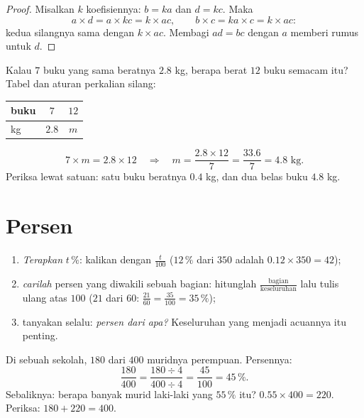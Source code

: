 \begin{proof}
Misalkan $k$ koefisiennya: $b = ka$ dan $d = kc$. Maka
\[
a \times d = a \times kc = k \times ac,
\qquad
b \times c = ka \times c = k \times ac :
\]
kedua  silangnya sama dengan $k \times ac$. Membagi
$ad = bc$ dengan $a$ memberi rumus untuk $d$.
\end{proof}

\begin{example}\label{ex:g7:prop:fourth}
Kalau $7$ buku yang sama beratnya $2.8$ kg, berapa berat $12$ buku
semacam itu? Tabel dan aturan perkalian silang:
\begin{center}
\renewcommand{\arraystretch}{1.3}
\begin{tabular}{l|cc}
buku & $7$ & $12$ \\
\hline
kg & $2.8$ & $m$ \\
\end{tabular}
\end{center}
\[
7 \times m = 2.8 \times 12
\quad\Longrightarrow\quad
m = \frac{2.8 \times 12}{7} = \frac{33.6}{7} = 4.8 \text{ kg}.
\]
Periksa lewat satuan: satu buku beratnya $0.4$ kg, dan dua belas buku $4.8$ kg.
\end{example}

\section{Persen}

\begin{method}\label{met:g7:prop:percent}
\begin{enumerate}
  \item \emph{Terapkan} $t\,\%$: kalikan dengan $\frac{t}{100}$
        ($12\,\%$ dari $350$ adalah $0.12 \times 350 = 42$);
  \item \emph{carilah} persen yang diwakili sebuah bagian: hitunglah
        $\frac{\text{bagian}}{\text{keseluruhan}}$ lalu tulis ulang
        atas $100$ ($21$ dari $60$:
        $\frac{21}{60} = \frac{35}{100} = 35\,\%$);
  \item tanyakan selalu: \emph{persen dari apa?} Keseluruhan yang
        menjadi acuannya itu penting.
\end{enumerate}
\end{method}

\begin{example}\label{ex:g7:prop:percent}
Di sebuah sekolah, $180$ dari $400$ muridnya perempuan. Persennya:
\[
\frac{180}{400} = \frac{180 \div 4}{400 \div 4} = \frac{45}{100}
= 45\,\% .
\]
Sebaliknya: berapa banyak murid laki-laki yang $55\,\%$ itu?
$0.55 \times 400 = 220$. Periksa: $180 + 220 = 400$.
\end{example}

